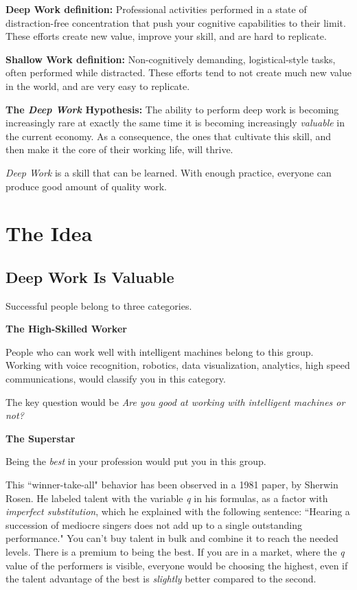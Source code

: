 \documentclass[12pt, letterpaper]{article}
\begin{document}
\bigbreak
\textbf{Deep Work definition:} Professional activities performed in a state of distraction-free concentration that push your cognitive capabilities to their limit. These efforts create new value, improve your skill, and are hard to replicate.

\textbf{Shallow Work definition:} Non-cognitively demanding, logistical-style tasks, often performed while distracted. These efforts tend to not create much new value in the world, and are very easy to replicate.

\bigbreak
\textbf{The \emph{Deep Work} Hypothesis:} The ability to perform deep work is becoming increasingly rare at exactly the same time it is becoming increasingly \emph{valuable} in the current economy. As a consequence, the ones that cultivate this skill, and then make it the core of their working life, will thrive.

\bigbreak
\emph{Deep Work} is a skill that can be learned. With enough practice, everyone can produce good amount of quality work.

\break
\section*{The Idea}
\subsection*{Deep Work Is Valuable}

Successful people belong to three categories.

\bigbreak\noindent\textbf{The High-Skilled Worker}

People who can work well with intelligent machines belong to this group. Working with voice recognition, robotics, data visualization, analytics, high speed communications, would classify you in this category.

The key question would be \emph{Are you good at working with intelligent machines or not?}

\bigbreak\noindent\textbf{The Superstar}

Being the \emph{best} in your profession would put you in this group.

This ``winner-take-all" behavior has been observed in a 1981 paper, by Sherwin Rosen. He labeled talent with the variable \emph{q} in his formulas, as a factor with \emph{imperfect substitution}, which he explained with the following sentence: ``Hearing a succession of mediocre singers does not add up to a single outstanding performance." You can't buy talent in bulk and combine it to reach the needed levels. There is a premium to being the best. If you are in a market, where the \emph{q} value of the performers is visible, everyone would be choosing the highest, even if the talent advantage of the best is \textit{slightly} better compared to the second.
\end{document}
